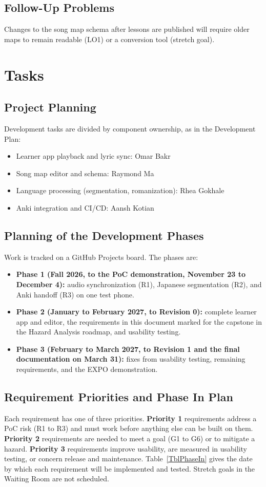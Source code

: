\documentclass[12pt]{article}
\begin{document}
\subsection{Follow-Up Problems}
Changes to the song map schema after lessons are published will require older
maps to remain readable (LO1) or a conversion tool (stretch goal).

\section{Tasks}
\subsection{Project Planning}
Development tasks are divided by component ownership, as in the Development
Plan:
\begin{itemize}
    \item Learner app playback and lyric sync: Omar Bakr
    \item Song map editor and schema: Raymond Ma
    \item Language processing (segmentation, romanization): Rhea Gokhale
    \item Anki integration and CI/CD: Aansh Kotian
\end{itemize}

\subsection{Planning of the Development Phases}
Work is tracked on a GitHub Projects board. The phases are:
\begin{itemize}
    \item \textbf{Phase 1 (Fall 2026, to the PoC demonstration, November 23 to
          December 4):} audio synchronization (R1), Japanese segmentation
          (R2), and Anki handoff (R3) on one test phone.
    \item \textbf{Phase 2 (January to February 2027, to Revision 0):} complete
          learner app and editor, the requirements in this document marked for
          the capstone in the Hazard Analysis roadmap, and usability testing.
    \item \textbf{Phase 3 (February to March 2027, to Revision 1 and the
          final documentation on March 31):} fixes from usability testing,
          remaining requirements, and the EXPO demonstration.
\end{itemize}

\subsection{Requirement Priorities and Phase In Plan} \label{SecPhaseIn}
Each requirement has one of three priorities.
\textbf{Priority 1} requirements address a PoC risk (R1 to R3) and must work
before anything else can be built on them. \textbf{Priority 2} requirements
are needed to meet a goal (G1 to G6) or to mitigate a hazard. \textbf{Priority
3} requirements improve usability, are measured in usability testing, or
concern release and maintenance. Table~\ref{TblPhaseIn} gives the date by
which each requirement will be implemented and tested. Stretch goals in the
Waiting Room are not scheduled.
\end{document}
